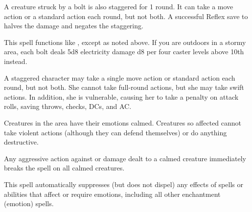 \begin{spellblood}
  A creature struck by a bolt is also staggered for 1 round. It can take a move action or a standard action each round, but not both. A successful Reflex save to halves the damage and negates the staggering.
\end{spellblood}
\begin{spelleffect}
  This spell functions like , except as noted above. If you are outdoors in a stormy area, each bolt deals 5d8 electricity damage \add d8 per four caster levels above 10th instead.
\end{spelleffect}
\begin{spellnotes}
 A staggered character may take a single move action or standard action each round, but not both. She cannot take full-round actions, but she may take swift actions. In addition, she is vulnerable, causing her to take a  penalty on attack rolls, saving throws, checks, DCs, and AC.
\end{spellnotes}

\spellrng{\rngmed}
\begin{spelleffect}
  Creatures in the area have their emotions calmed. Creatures so affected cannot take violent actions (although they can defend themselves) or do anything destructive.
\end{spelleffect}
\begin{spellnotes}
  Any aggressive action against or damage dealt to a calmed creature immediately breaks the spell on all calmed creatures.

  This spell automatically suppresses (but does not dispel) any effects of spells or abilities that affect or require emotions, including all other enchantment (emotion) spells.
\end{spellnotes}

